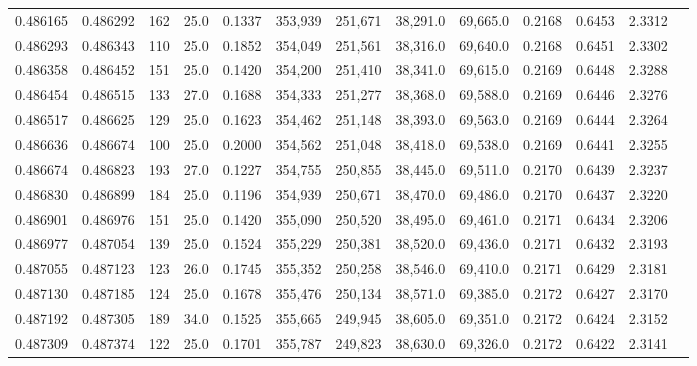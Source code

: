 \begin{tabular}{rrrrrrrrrrrrr}
0.486165 & 0.486292 &   162 & 25.0 &                                     0.1337 & 353,939 & 251,671 &  38,291.0 &  69,665.0 & 0.2168 & 0.6453 & 2.3312 \\
0.486293 & 0.486343 &   110 & 25.0 &                                     0.1852 & 354,049 & 251,561 &  38,316.0 &  69,640.0 & 0.2168 & 0.6451 & 2.3302 \\
0.486358 & 0.486452 &   151 & 25.0 &                                     0.1420 & 354,200 & 251,410 &  38,341.0 &  69,615.0 & 0.2169 & 0.6448 & 2.3288 \\
0.486454 & 0.486515 &   133 & 27.0 &                                     0.1688 & 354,333 & 251,277 &  38,368.0 &  69,588.0 & 0.2169 & 0.6446 & 2.3276 \\
0.486517 & 0.486625 &   129 & 25.0 &                                     0.1623 & 354,462 & 251,148 &  38,393.0 &  69,563.0 & 0.2169 & 0.6444 & 2.3264 \\
0.486636 & 0.486674 &   100 & 25.0 &                                     0.2000 & 354,562 & 251,048 &  38,418.0 &  69,538.0 & 0.2169 & 0.6441 & 2.3255 \\
0.486674 & 0.486823 &   193 & 27.0 &                                     0.1227 & 354,755 & 250,855 &  38,445.0 &  69,511.0 & 0.2170 & 0.6439 & 2.3237 \\
0.486830 & 0.486899 &   184 & 25.0 &                                     0.1196 & 354,939 & 250,671 &  38,470.0 &  69,486.0 & 0.2170 & 0.6437 & 2.3220 \\
0.486901 & 0.486976 &   151 & 25.0 &                                     0.1420 & 355,090 & 250,520 &  38,495.0 &  69,461.0 & 0.2171 & 0.6434 & 2.3206 \\
0.486977 & 0.487054 &   139 & 25.0 &                                     0.1524 & 355,229 & 250,381 &  38,520.0 &  69,436.0 & 0.2171 & 0.6432 & 2.3193 \\
0.487055 & 0.487123 &   123 & 26.0 &                                     0.1745 & 355,352 & 250,258 &  38,546.0 &  69,410.0 & 0.2171 & 0.6429 & 2.3181 \\
0.487130 & 0.487185 &   124 & 25.0 &                                     0.1678 & 355,476 & 250,134 &  38,571.0 &  69,385.0 & 0.2172 & 0.6427 & 2.3170 \\
0.487192 & 0.487305 &   189 & 34.0 &                                     0.1525 & 355,665 & 249,945 &  38,605.0 &  69,351.0 & 0.2172 & 0.6424 & 2.3152 \\
0.487309 & 0.487374 &   122 & 25.0 &                                     0.1701 & 355,787 & 249,823 &  38,630.0 &  69,326.0 & 0.2172 & 0.6422 & 2.3141 \\

\end{tabular}
